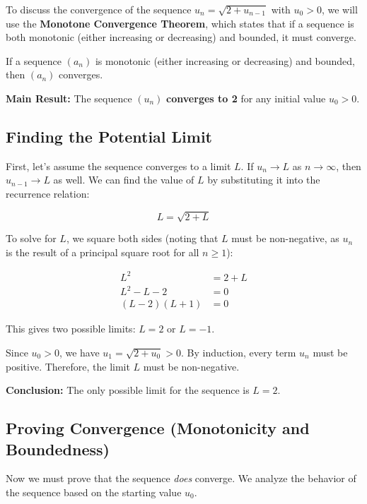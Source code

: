 \documentclass[12pt,a4paper]{article}
\theoremstyle{definition}
\begin{document}
To discuss the convergence of the sequence $u_n = \sqrt{2 + u_{n-1}}$ with $u_0 > 0$, we will use the \textbf{Monotone Convergence Theorem}, which states that if a sequence is both monotonic (either increasing or decreasing) and bounded, it must converge.

\begin{tcolorbox}[title=Monotone Convergence Theorem, colback=blue!5!white, colframe=blue!75!black]
If a sequence $(a_n)$ is monotonic (either increasing or decreasing) and bounded, then $(a_n)$ converges.
\end{tcolorbox}

\textbf{Main Result:} The sequence $(u_n)$ \textbf{converges to 2} for any initial value $u_0 > 0$.

\subsection{Finding the Potential Limit}

First, let's assume the sequence converges to a limit $L$. If $u_n \to L$ as $n \to \infty$, then $u_{n-1} \to L$ as well. We can find the value of $L$ by substituting it into the recurrence relation:

\[
L = \sqrt{2 + L}
\]

To solve for $L$, we square both sides (noting that $L$ must be non-negative, as $u_n$ is the result of a principal square root for all $n \ge 1$):

\begin{align*}
L^2 &= 2 + L\\
L^2 - L - 2 &= 0\\
(L - 2)(L + 1) &= 0
\end{align*}

This gives two possible limits: $L = 2$ or $L = -1$.

Since $u_0 > 0$, we have $u_1 = \sqrt{2 + u_0} > 0$. By induction, every term $u_n$ must be positive. Therefore, the limit $L$ must be non-negative.

\textbf{Conclusion:} The only possible limit for the sequence is $L = 2$.

\subsection{Proving Convergence (Monotonicity and Boundedness)}

Now we must prove that the sequence \textit{does} converge. We analyze the behavior of the sequence based on the starting value $u_0$.
\end{document}
